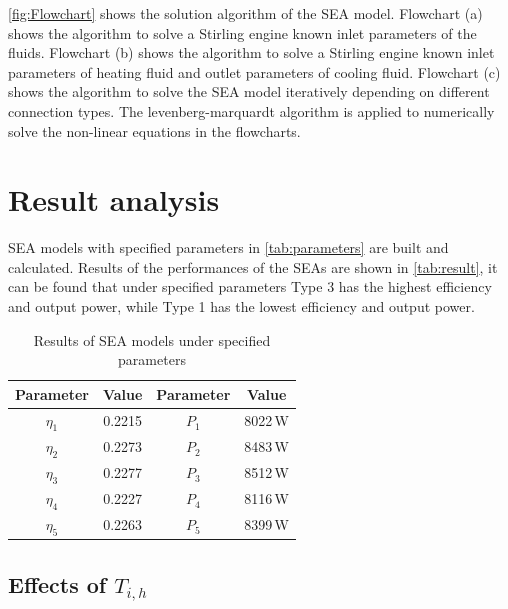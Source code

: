 \autoref{fig:Flowchart} shows the solution algorithm of the SEA model. Flowchart (a) shows the algorithm to solve a Stirling engine known inlet parameters of the fluids. Flowchart (b) shows the algorithm to solve a Stirling engine known inlet parameters of heating fluid and outlet parameters of cooling fluid. Flowchart (c) shows the algorithm to solve the SEA model iteratively depending on different connection types. The levenberg-marquardt algorithm is applied to numerically solve the non-linear equations in the flowcharts.

\section{Result analysis}

SEA models with specified parameters in \autoref{tab:parameters} are built and calculated. Results of the performances of the SEAs are shown in \autoref{tab:result}, it can be found that under specified parameters Type 3 has the highest efficiency and output power, while Type 1 has the lowest efficiency and output power.

\begin{table}[htbp]
	\caption{Results of SEA models under specified parameters}
	\centering
	\begin{tabular}{cccc}
		\toprule
		Parameter		&	Value	&	Parameter		&	Value\\
		\midrule
		$\eta_1$	&	0.2215	&	$P_1$		&	8022\,W\\
		$\eta_2$	&	0.2273	&	$P_2$		&	8483\,W\\
		$\eta_3$	&	0.2277	&	$P_3$		&	8512\,W\\
		$\eta_4$	&	0.2227	&	$P_4$		&	8116\,W\\
		$\eta_5$	&	0.2263	&	$P_5$		&	8399\,W\\		
		\bottomrule
	\end{tabular}
	\label{tab:result}
\end{table}

\subsection{Effects of $T_{i,h}$}

